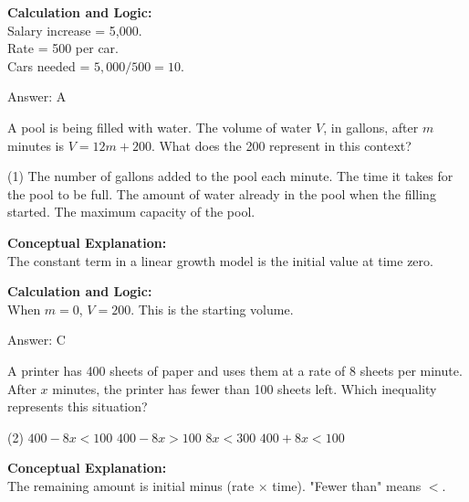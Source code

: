 \documentclass[11pt,paper=a4,answers]{exam}
\begin{document}
\begin{questions}
\begin{solution}
\vspace{10pt}
\textbf{Calculation and Logic:} \\
Salary increase = 5,000. \\
Rate = 500 per car. \\
Cars needed = $5,000 / 500 = 10$.

\vspace{15pt}
Answer: \colorbox{yellow!100}{A}
\end{solution}

\vspace{20pt}

\question
A pool is being filled with water. The volume of water $V$, in gallons, after $m$ minutes is $V = 12m + 200$. What does the 200 represent in this context?
\begin{tasks}(1)
    \task The number of gallons added to the pool each minute.
    \task The time it takes for the pool to be full.
    \task The amount of water already in the pool when the filling started.
    \task The maximum capacity of the pool.
\end{tasks}

\begin{solution}
\textbf{Conceptual Explanation:} \\
The constant term in a linear growth model is the initial value at time zero.

\vspace{10pt}
\textbf{Calculation and Logic:} \\
When $m = 0$, $V = 200$. This is the starting volume.

\vspace{15pt}
Answer: \colorbox{yellow!100}{C}
\end{solution}

\vspace{20pt}

\question
A printer has 400 sheets of paper and uses them at a rate of 8 sheets per minute. After $x$ minutes, the printer has fewer than 100 sheets left. Which inequality represents this situation?
\begin{tasks}(2)
    \task $400 - 8x < 100$
    \task $400 - 8x > 100$
    \task $8x < 300$
    \task $400 + 8x < 100$
\end{tasks}

\begin{solution}
\textbf{Conceptual Explanation:} \\
The remaining amount is initial minus (rate $\times$ time). "Fewer than" means $<$.


\end{solution}
\end{questions}
\end{document}
